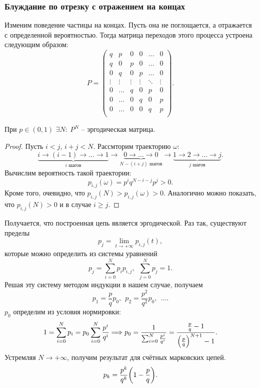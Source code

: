 \subsubsection{Блуждание по отрезку с отражением на концах}
Изменим поведение частицы на концах. Пусть она не поглощается, а
отражается с определенной вероятностью. Тогда матрица переходов
этого процесса устроена следующим образом:
\[
    P = \begin{pmatrix}
        q & p & 0 & 0 & \ldots & 0 \\
        q & 0 & p & 0 & \ldots & 0 \\
        0 & q & 0 & p & \ldots & 0 \\
        \vdots & \vdots & \vdots & \vdots & \ddots & \vdots \\
        0 & \ldots & q & 0 & p & 0 \\
        0 & \ldots & 0 & q & 0 & p \\
        0 & \ldots & 0 & 0 & q & p \\
    \end{pmatrix}
.\]
\begin{proposition}
    При $p \in (0, 1)$ $\exists N\colon~ P^N$ -- эргодическая матрица.
\end{proposition}
\begin{proof}
    Пусть $i < j$, $i + j < N$. Рассмторим траекторию $\omega$:
    \[
        \underbrace{i \to (i - 1) \to \ldots \to 1}_{i \text{ шагов}} \to
        \underbrace{0 \to \ldots \to 0}_{N - (i + j) \text{ шагов}} \to 
        \underbrace{1 \to 2 \to \ldots \to j}_{j \text{ шагов}}
    .\]
    Вычислим вероятность такой траектории:
    \[
        p_{i, j}(\omega) = p^i q^{N - i - j} p^j > 0
    .\]
    Кроме того, очевидно, что $p_{i, j}(N) > p_{i, j}(\omega) > 0$.
    Аналогично можно показать, что $p_{i, j}(N) > 0$ и в случае $i \geqslant j$.
\end{proof}

Получается, что построенная цепь является эргодической. Раз так, существуют
пределы
\[
    p_j = \lim_{t \to +\infty}{p_{i, j}(t)}
,\]
которые можно определить из системы уравнений
\[
    p_j = \sum_{i = 0}^N{p_i p_{i, j}},~~ \sum_{j = 0}^N{p_j} = 1
.\]
Решая эту систему методом индукции в нашем случае, получаем
\[
    p_1 = \frac{p}{q} p_0,~~ p_2 = \frac{p^2}{q^2} p_0,~~ \ldots
.\]
$p_0$ определим из условия нормировки:
\[
    1 = \sum_{i = 0}^N{p_i} = p_0 \sum_{i = 0}^N{\frac{p^i}{q^i}} \Lra
    p_0 = \frac{1}{\sum_{i = 0}^N{\frac{p^i}{q^i}}} = 
    \frac{\frac{p}{q} - 1}{\parens*{\frac{p}{q}}^{N + 1} - 1}
.\]
Устремляя $N \to +\infty$, получим результат для счётных марковских цепей.
\[
    p_k = \frac{p^k}{q^k} \parens*{1 - \frac{p}{q}} 
.\]


